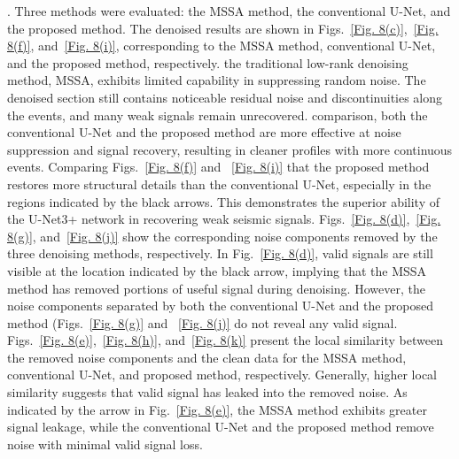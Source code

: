 \documentclass[preprint,12pt,authoryear]{elsarticle}
\begin{document}
. Three methods were evaluated: the MSSA method, the conventional U-Net, and the proposed method. The denoised results are shown in Figs.~\ref{Fig. 8(c)},~\ref{Fig. 8(f)}, and~\ref{Fig. 8(i)}, corresponding to the MSSA method, conventional U-Net, and the proposed method, respectively.  the traditional low-rank denoising method, MSSA, exhibits limited capability in suppressing random noise. The denoised section still contains noticeable residual noise and discontinuities along the events, and many weak signals remain unrecovered.  comparison, both the conventional U-Net and the proposed method are more effective at noise suppression and signal recovery, resulting in cleaner profiles with more continuous events. Comparing Figs.~\ref{Fig. 8(f)} and ~\ref{Fig. 8(i)}  that the proposed method restores more structural details than the conventional U-Net, especially in the regions indicated by the black arrows. This demonstrates the superior ability of the U-Net3+ network in recovering weak seismic signals. Figs.~\ref{Fig. 8(d)},~\ref{Fig. 8(g)}, and~\ref{Fig. 8(j)} show the corresponding noise components removed by the three denoising methods, respectively. In Fig.~\ref{Fig. 8(d)}, valid signals are still visible at the location indicated by the black arrow, implying that the MSSA method has removed portions of useful signal during denoising. However, the noise components separated by both the conventional U-Net and the proposed method (Figs.~\ref{Fig. 8(g)} and ~\ref{Fig. 8(j)} do not reveal any valid signal. Figs.~\ref{Fig. 8(e)},~\ref{Fig. 8(h)}, and~\ref{Fig. 8(k)}  present the local similarity between the removed noise components and the clean data for the MSSA method, conventional U-Net, and proposed method, respectively. Generally, higher local similarity suggests that valid signal has leaked into the removed noise. As indicated by the arrow in Fig.~\ref{Fig. 8(e)}, the MSSA method exhibits greater signal leakage, while the conventional U-Net and the proposed method remove noise with minimal valid signal loss.
\end{document}
